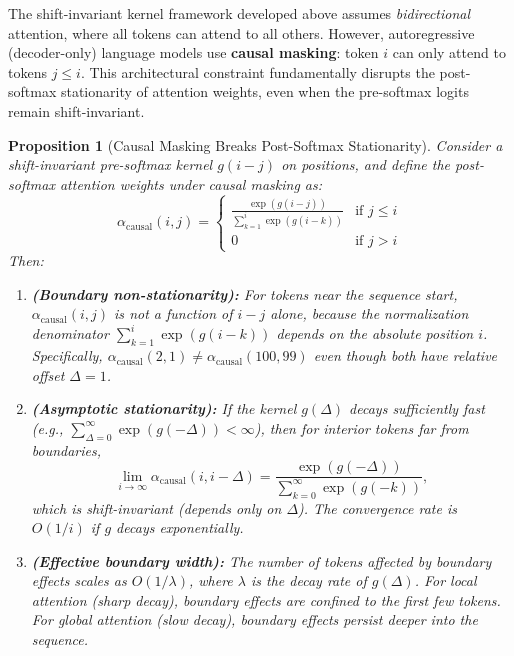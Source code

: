\documentclass[11pt]{article}
\newtheorem{proposition}[theorem]{Proposition}
\theoremstyle{definition}
\begin{document}
The shift-invariant kernel framework developed above assumes \emph{bidirectional} attention, where all tokens can attend to all others. However, autoregressive (decoder-only) language models use \textbf{causal masking}: token $i$ can only attend to tokens $j \leq i$. This architectural constraint fundamentally disrupts the post-softmax stationarity of attention weights, even when the pre-softmax logits remain shift-invariant.

\begin{proposition}[Causal Masking Breaks Post-Softmax Stationarity]
\label{prop:causal-mask}
Consider a shift-invariant pre-softmax kernel $g(i-j)$ on positions, and define the post-softmax attention weights under causal masking as:
\[
\alpha_{\text{causal}}(i,j) = \begin{cases}
\frac{\exp(g(i-j))}{\sum_{k=1}^i \exp(g(i-k))} & \text{if } j \leq i \\
0 & \text{if } j > i
\end{cases}
\]
Then:
\begin{enumerate}
    \item[\textup{(a)}] \textbf{(Boundary non-stationarity):} For tokens near the sequence start, $\alpha_{\text{causal}}(i,j)$ is \emph{not} a function of $i-j$ alone, because the normalization denominator $\sum_{k=1}^i \exp(g(i-k))$ depends on the absolute position $i$. Specifically, $\alpha_{\text{causal}}(2, 1) \neq \alpha_{\text{causal}}(100, 99)$ even though both have relative offset $\Delta = 1$.

    \item[\textup{(b)}] \textbf{(Asymptotic stationarity):} If the kernel $g(\Delta)$ decays sufficiently fast (e.g., $\sum_{\Delta=0}^\infty \exp(g(-\Delta)) < \infty$), then for interior tokens far from boundaries,
    \[
    \lim_{i \to \infty} \alpha_{\text{causal}}(i, i-\Delta) = \frac{\exp(g(-\Delta))}{\sum_{k=0}^\infty \exp(g(-k))},
    \]
    which \emph{is} shift-invariant (depends only on $\Delta$). The convergence rate is $O(1/i)$ if $g$ decays exponentially.

    \item[\textup{(c)}] \textbf{(Effective boundary width):} The number of tokens affected by boundary effects scales as $O(1/\lambda)$, where $\lambda$ is the decay rate of $g(\Delta)$. For local attention (sharp decay), boundary effects are confined to the first few tokens. For global attention (slow decay), boundary effects persist deeper into the sequence.
\end{enumerate}
\end{proposition}
\end{document}
